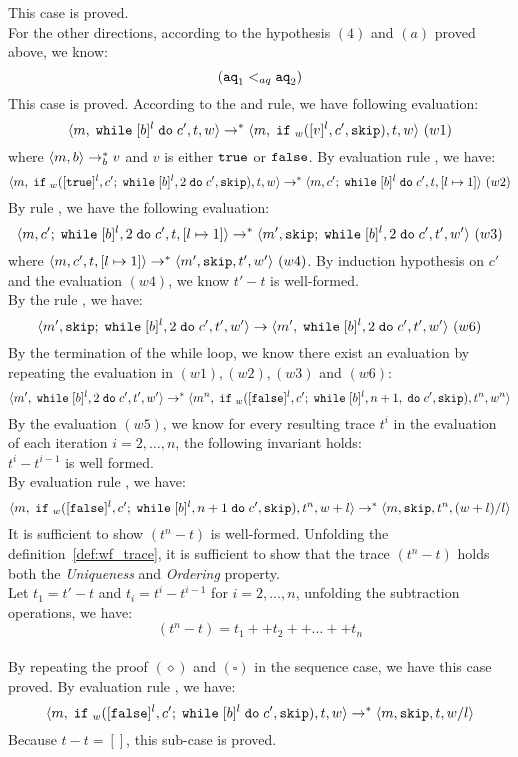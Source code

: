 %
This case is proved.
%
\\
%
For the other directions, according to the hypothesis $(4)$ and $(a)$ proved above, we know:
\[
	(\mathtt{aq}_1 <_{aq} \mathtt{aq}_2)
\]
%
This case is proved.
%
%
According to the  and  rule, we have following evaluation:
\[
	\langle m, \;\mathtt{while}\; [b]^l \;\mathtt{do}\; c', t, w \rangle \to^{*}
	\langle m, \;\mathtt{if}\;_w([v]^l, c', \mathtt{skip}), t, w \rangle ~ (w1)
\]
%
where $\langle m, b \rangle \rightarrow_b^{*} v$ and $v$ is either $\mathtt{true}$ or $\mathtt{false}$.
%
%
By evaluation rule , we have:
%
\[
	\langle m, \;\mathtt{if}\;_w([\mathtt{true}]^l, c';\;\mathtt{while}\; [b]^l, 2 \;\mathtt{do}\; c', \mathtt{skip}), t, w \rangle 
	\to^{*} \langle m, c';\;\mathtt{while}\; [b]^l \;\mathtt{do}\; c', t, [l \mapsto 1] \rangle ~ (w2)
\]
%
By rule , we have the following evaluation:
%
\[
	\langle m, c';\;\mathtt{while}\; [b]^l, 2 \;\mathtt{do}\; c', t, [l \mapsto 1] \rangle \to^{*} \langle m', \mathtt{skip};\;\mathtt{while}\; [b]^l, 2 \;\mathtt{do}\; c', t', w' \rangle ~ (w3)
\] 
%
where $\langle m, c', t, [l \mapsto 1] \rangle \to^{*} \langle m', \mathtt{skip}, t', w' \rangle ~ (w4)$. 
%
By induction hypothesis on $c'$ and the evaluation $(w4)$, we know $t' - t$ is well-formed.
\\
By the rule , we have:
%
\[
	\langle m', \mathtt{skip};\;\mathtt{while}\; [b]^l, 2 \;\mathtt{do}\; c', t', w' \rangle \to \langle m', \;\mathtt{while}\; [b]^l, 2 \;\mathtt{do}\; c', t', w' \rangle ~ (w6)
\]
%
By the termination of the while loop, we know there exist an evaluation by repeating the evaluation in $(w1), (w2), (w3)$ and $(w6)$:
%
\[
	\langle m', \;\mathtt{while}\; [b]^l, 2 \;\mathtt{do}\; c', t', w' \rangle \to^{*} \langle m^n, \;\mathtt{if}\;_w([\mathtt{false}]^l, c';\;\mathtt{while}\; [b]^l, n + 1, \;\mathtt{do}\; c', \mathtt{skip}), t^n, w^n \rangle
\]
%
By the evaluation $(w5)$, we know for every resulting trace $t^i$ in the evaluation of each iteration $i = 2, \ldots, n$,
the following invariant holds:
\\
$t^i - t^{i - 1}$ is well formed.
\\
%
By evaluation rule , we have:
%
\[
	\langle m, \;\mathtt{if}\;_w([\mathtt{false}]^l, c';\;\mathtt{while}\; [b]^l, n + 1 \;\mathtt{do}\; c', \mathtt{skip}), t^n, w + l \rangle 
	\to^{*} \langle m, \mathtt{skip}, t^n, (w + l)/l \rangle
\]
%
%
It is sufficient to show $(t^n - t)$ is well-formed.
%
Unfolding the definition~\ref{def:wf_trace}, it is sufficient to show that the trace $(t^n - t)$ holds both the \emph{Uniqueness} and \emph{Ordering} property.
\\
Let $t_1 = t' - t$ and $t_i = t^{i} - t^{i - 1}$ for $i = 2, \ldots, n$, unfolding the subtraction operations, we have:
\[
	(t^n - t) = t_1 ++ t_2 ++ \ldots ++ t_n
\]
\\
By repeating the proof $(\diamond)$ and $(\square)$ in the sequence case, we have this case proved. 
%
%
By evaluation rule , we have:
%
\[
	\langle m, \;\mathtt{if}\;_w([\mathtt{false}]^l, c';\;\mathtt{while}\; [b]^l \;\mathtt{do}\; c', \mathtt{skip}), t, w \rangle 
	\to^{*} \langle m, \mathtt{skip}, t, w/l \rangle
\]
%
%
Because $t - t = []$, this sub-case is proved.
%
